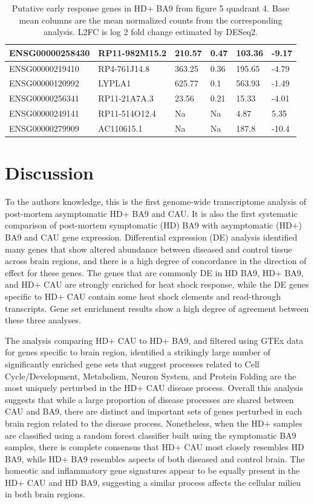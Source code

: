 \documentclass[fleqn,10pt,table]{wlscirep}
\begin{document}
\begin{table}[ht]
\begin{tabular}{|l|l|l|l|l|l|}
ENSG00000258430 & RP11-982M15.2 & 210.57 & 0.47 & 103.36 & -9.17 \\ \hline
ENSG00000219410 & RP4-761J14.8 & 363.25 & 0.36 & 195.65 & -4.79 \\ \hline
ENSG00000120992 & LYPLA1 & 625.77 & 0.1 & 563.93 & -1.49 \\ \hline
ENSG00000256341 & RP11-21A7A.3 & 23.56 & 0.21 & 15.33 & -4.01 \\ \hline
ENSG00000249141 & RP11-514O12.4 & Na & Na & 4.87 & 5.35 \\ \hline
ENSG00000279909 & AC110615.1  & Na & Na & 187.8 & -10.4 \\ \hline
\end{tabular}
\caption{Putative early response genes in HD+ BA9 from figure 5 quadrant 4. Base mean columns are the mean normalized counts from the corresponding analysis. L2FC is log 2 fold change estimated by DESeq2. \label{tab:early_discordant_genes_IV}}
\end{table}

\section{Discussion}

To the authors knowledge, this is the first genome-wide transcriptome analysis of post-mortem asymptomatic HD+ BA9 and CAU.
It is also the first systematic comparison of post-mortem symptomatic (HD) BA9 with asymptomatic (HD+) BA9 and CAU gene expression.
Differential expression (DE) analysis identified many genes that show altered abundance between diseased and control tissue across brain regions, and there is a high degree of concordance in the direction of effect for these genes.
The genes that are commonly DE in HD BA9,  HD+ BA9, and HD+ CAU are strongly enriched for heat shock response, while the DE genes specific to HD+ CAU contain some heat shock elements and read-through transcripts.
Gene set enrichment results show a high degree of agreement between these three analyses.

The analysis comparing HD+ CAU to HD+ BA9, and filtered using GTEx data for genes specific to brain region, identified a strikingly large number of significantly enriched gene sets that suggest processes related to Cell Cycle/Development, Metabolism, Neuron System, and Protein Folding are the most uniquely perturbed in the HD+ CAU disease process.
Overall this analysis suggests that while a large proportion of disease processes are shared between CAU and BA9, there are distinct and important sets of genes perturbed in each brain region related to the disease process.
Nonetheless, when the HD+ samples are classified using a random forest classifier built using the symptomatic BA9 samples, there is complete consensus that HD+ CAU most closely resembles HD BA9, while HD+ BA9 resembles aspects of both diseased and control brain.
The homeotic and inflammatory gene signatures appear to be equally present in the HD+ CAU and HD BA9, suggesting a similar process affects the cellular milieu in both brain regions.
\end{document}
